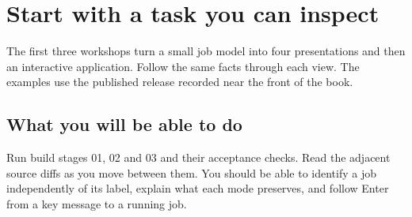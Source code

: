 \chapter*{Start with a task you can inspect}

The first three workshops turn a small job model into four presentations and then an interactive application. Follow the same facts through each view. The examples use the published release recorded near the front of the book.

\section*{What you will be able to do}

Run build stages 01, 02 and 03 and their acceptance checks. Read the adjacent source diffs as you move between them. You should be able to identify a job independently of its label, explain what each mode preserves, and follow Enter from a key message to a running job.

